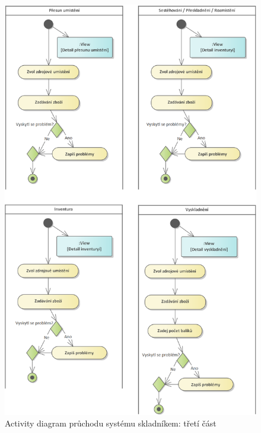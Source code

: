 \begin{figure}[]
\includegraphics[height=\textheight]{../png/diagrams/ac3.png}
\caption{Activity diagram průchodu systému skladníkem: třetí část} \label{picture:storekeeper3}
\end{figure}
